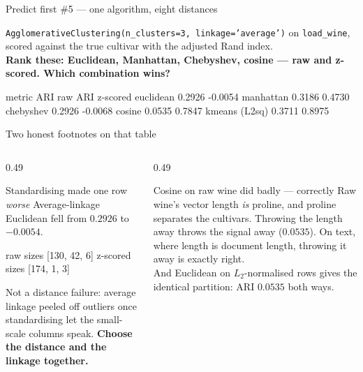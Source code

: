 \documentclass[aspectratio=169]{beamer}
\begin{document}
\begin{frame}[fragile]{Predict first \#5 --- one algorithm, eight distances}
  \begin{exampleblock}{}
    \centering\small
    \texttt{AgglomerativeClustering(n\_clusters=3, linkage='average')} on
    \texttt{load\_wine}, scored against the true cultivar with the adjusted
    Rand index.\\[0.3em]
    \textbf{Rank these: Euclidean, Manhattan, Chebyshev, cosine --- raw and
    z-scored. Which combination wins?}
  \end{exampleblock}
\begin{outblk}
metric              ARI raw ARI z-scored
euclidean            0.2926      -0.0054
manhattan            0.3186       0.4730
chebyshev            0.2926      -0.0068
cosine               0.0535       0.7847
kmeans (L2sq)        0.3711       0.8975
\end{outblk}
\end{frame}

\begin{frame}[fragile,shrink=3]{Two honest footnotes on that table}
  \begin{columns}[T]
    \begin{column}{0.49\textwidth}
      \begin{alertblock}{Standardising made one row \emph{worse}}
        Average-linkage Euclidean fell from $0.2926$ to $-0.0054$.
\begin{outblk}
  raw       sizes [130, 42, 6]
  z-scored  sizes [174, 1, 3]
\end{outblk}
        Not a distance failure: average linkage peeled off outliers once
        standardising let the small-scale columns speak. \textbf{Choose the
        distance and the linkage together.}
      \end{alertblock}
    \end{column}
    \begin{column}{0.49\textwidth}
      \begin{block}{Cosine on raw wine did badly --- correctly}
        Raw wine's vector length \emph{is} proline, and proline separates
        the cultivars. Throwing the length away throws the signal away
        ($0.0535$). On text, where length is document length, throwing it
        away is exactly right.\\[0.3em]
        \small And Euclidean on $L_2$-normalised rows gives the identical
        partition: ARI $0.0535$ both ways.
      \end{block}
    \end{column}
  \end{columns}
\end{frame}
\end{document}
